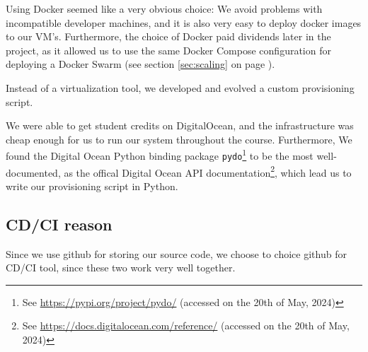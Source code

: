 Using Docker seemed like a very obvious choice: We avoid problems with incompatible developer machines, and it is also very easy to deploy docker images to our VM's. Furthermore, the choice of Docker paid dividends later in the project, as it allowed us to use the same Docker Compose configuration for deploying a Docker Swarm (see section \ref{sec:scaling} on page \pageref{sec:scaling}).

Instead of a virtualization tool, we developed and evolved a custom provisioning script.%


We were able to get student credits on DigitalOcean, and the infrastructure was cheap enough for us to run our system throughout the course.
Furthermore, We found the Digital Ocean Python binding package \texttt{pydo}\footnote{See \url{https://pypi.org/project/pydo/} (accessed on the 20th of May, 2024)} to be the most well-documented, as the offical Digital Ocean API documentation\footnote{See \url{https://docs.digitalocean.com/reference/} (accessed on the 20th of May, 2024)}, which lead us to write our provisioning script in Python.


\subsection{CD/CI reason}
Since we use github for storing our source code, we choose to choice github for CD/CI tool, since these two work very well together.

